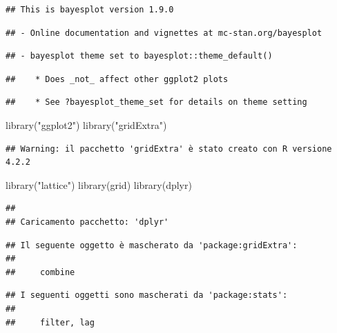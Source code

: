 \documentclass[
  11pt,
]{article}
\newenvironment{Shaded}{\begin{snugshade}}{\end{snugshade}}
\newcommand{\FunctionTok}[1]{\textcolor[rgb]{0.00,0.00,0.00}{#1}}
\newcommand{\NormalTok}[1]{#1}
\newcommand{\StringTok}[1]{\textcolor[rgb]{0.31,0.60,0.02}{#1}}
\begin{document}
\begin{verbatim}
## This is bayesplot version 1.9.0
\end{verbatim}

\begin{verbatim}
## - Online documentation and vignettes at mc-stan.org/bayesplot
\end{verbatim}

\begin{verbatim}
## - bayesplot theme set to bayesplot::theme_default()
\end{verbatim}

\begin{verbatim}
##    * Does _not_ affect other ggplot2 plots
\end{verbatim}

\begin{verbatim}
##    * See ?bayesplot_theme_set for details on theme setting
\end{verbatim}

\begin{Shaded}
\begin{Highlighting}[]
\FunctionTok{library}\NormalTok{(}\StringTok{"ggplot2"}\NormalTok{)}
\FunctionTok{library}\NormalTok{(}\StringTok{"gridExtra"}\NormalTok{)}
\end{Highlighting}
\end{Shaded}

\begin{verbatim}
## Warning: il pacchetto 'gridExtra' è stato creato con R versione 4.2.2
\end{verbatim}

\begin{Shaded}
\begin{Highlighting}[]
\FunctionTok{library}\NormalTok{(}\StringTok{"lattice"}\NormalTok{)}
\FunctionTok{library}\NormalTok{(grid)}
\FunctionTok{library}\NormalTok{(dplyr)}
\end{Highlighting}
\end{Shaded}

\begin{verbatim}
## 
## Caricamento pacchetto: 'dplyr'
\end{verbatim}

\begin{verbatim}
## Il seguente oggetto è mascherato da 'package:gridExtra':
## 
##     combine
\end{verbatim}

\begin{verbatim}
## I seguenti oggetti sono mascherati da 'package:stats':
## 
##     filter, lag
\end{verbatim}
\end{document}
